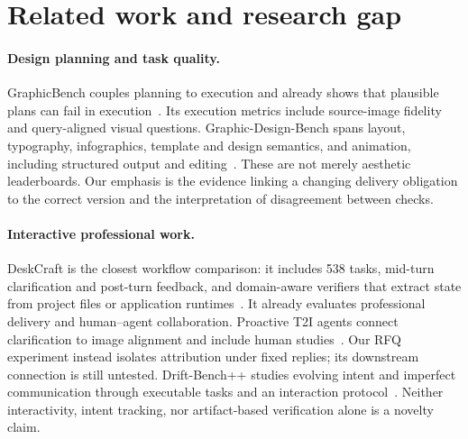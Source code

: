 \section{Related work and research gap}
\label{sec:related}
\paragraph{Design planning and task quality.}
GraphicBench couples planning to execution and already shows that plausible plans can fail in execution~\citep{ki2025graphicbench}. Its execution metrics include source-image fidelity and query-aligned visual questions. Graphic-Design-Bench spans layout, typography, infographics, template and design semantics, and animation, including structured output and editing~\citep{deganutti2026gdb}. These are not merely aesthetic leaderboards. Our emphasis is the evidence linking a changing delivery obligation to the correct version and the interpretation of disagreement between checks.

\paragraph{Interactive professional work.}
DeskCraft is the closest workflow comparison: it includes 538 tasks, mid-turn clarification and post-turn feedback, and domain-aware verifiers that extract state from project files or application runtimes~\citep{wang2026deskcraft}. It already evaluates professional delivery and human--agent collaboration. Proactive T2I agents connect clarification to image alignment and include human studies~\citep{hahn2025proactive}. Our RFQ experiment instead isolates attribution under fixed replies; its downstream connection is still untested. Drift-Bench++ studies evolving intent and imperfect communication through executable tasks and an interaction protocol~\citep{zhang2026drift}. Neither interactivity, intent tracking, nor artifact-based verification alone is a novelty claim.

